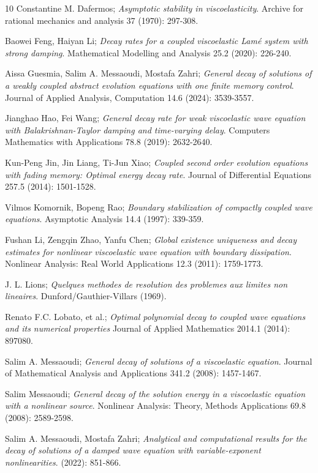 \documentclass[11pt]{article}
\numberwithin{equation}{section}
\begin{document}
\begin{thebibliography}{10}
 Constantine M. Dafermos;
\emph{Asymptotic stability in viscoelasticity}.
Archive for rational mechanics and analysis 37 (1970): 297-308.

 Baowei Feng, Haiyan Li;
\emph{Decay rates for a coupled viscoelastic Lam\'e system with strong damping}.
Mathematical Modelling and Analysis 25.2 (2020): 226-240.

 Aissa Guesmia, Salim A. Messaoudi, Mostafa Zahri;
\emph{General decay of solutions of a weakly coupled abstract evolution equations 
with one finite memory control}.
 Journal of Applied Analysis, Computation 14.6 (2024): 3539-3557.
 
 Jianghao Hao,  Fei Wang;
\emph{General decay rate for weak viscoelastic wave equation with Balakrishnan-Taylor 
damping and time-varying delay}.
Computers Mathematics with Applications 78.8 (2019): 2632-2640.

 Kun-Peng Jin, Jin Liang,  Ti-Jun Xiao;
\emph{Coupled second order evolution equations with fading memory: Optimal energy
 decay rate}. Journal of Differential Equations 257.5 (2014): 1501-1528.
 
 Vilmos Komornik, Bopeng Rao;
\emph{Boundary stabilization of compactly coupled wave equations}.
 Asymptotic Analysis 14.4 (1997): 339-359.
 
 Fushan Li, Zengqin Zhao, Yanfu Chen;
\emph{Global existence uniqueness and decay estimates for nonlinear viscoelastic 
wave equation with boundary dissipation}.
 Nonlinear Analysis: Real World Applications 12.3 (2011): 1759-1773.
 
 J. L. Lions;
\emph{Quelques methodes de resolution des problemes aux limites non lineaires}.
 Dunford/Gauthier-Villars (1969).
 
 Renato F.C. Lobato, et al.;
\emph{Optimal polynomial decay to coupled wave equations and its numerical properties}
 Journal of Applied Mathematics 2014.1 (2014): 897080.
 
 Salim A. Messaoudi;
\emph{General decay of solutions of a viscoelastic equation}.
Journal of Mathematical Analysis and Applications 341.2 (2008): 1457-1467.

 Salim Messaoudi;
\emph{General decay of the solution energy in a viscoelastic equation with a nonlinear 
source}. Nonlinear Analysis: Theory, Methods Applications 69.8 (2008): 2589-2598.

 Salim A. Messaoudi, Mostafa Zahri;
\emph{Analytical and computational results for the decay of solutions of a damped 
wave equation with variable-exponent nonlinearities}. (2022): 851-866.


\end{thebibliography}
\end{document}
